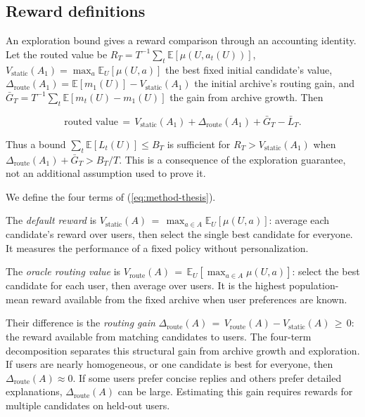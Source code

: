 \documentclass{article} %
\providecommand{\E}{\mathbb{E}}
\renewcommand{\eqref}[1]{\textup{(\ref{#1})}}
\begin{document}
\subsection{Reward definitions}

An exploration bound gives a reward comparison through an accounting
identity. Let the routed value be
$R_T=T^{-1}\sum_t\E[\mu(U,a_t(U))]$,
$V_{\mathrm{static}}(A_1)=\max_a\E_U[\mu(U,a)]$ the best fixed initial
candidate's value, $\Delta_{\mathrm{route}}(A_1)=\E[m_1(U)]-
V_{\mathrm{static}}(A_1)$ the initial archive's routing gain, and
$\bar G_T=T^{-1}\sum_t\E[m_t(U)-m_1(U)]$ the gain from archive growth.
Then

\begin{equation}
\label{eq:method-thesis}
\text{routed value}
\,=\, V_{\mathrm{static}}(A_1) + \Delta_{\mathrm{route}}(A_1) + \bar G_T - \bar L_T.
\end{equation}

Thus a bound $\sum_t\E[L_t(U)]\le B_T$ is sufficient for
$R_T>V_{\mathrm{static}}(A_1)$ when
$\Delta_{\mathrm{route}}(A_1)+\bar G_T>B_T/T$.
This is a consequence of the exploration guarantee, not an additional
assumption used to prove it.

We define the four terms of \eqref{eq:method-thesis}.

The \emph{default reward} is $V_{\mathrm{static}}(A) \,=\, \max_{a \in A} \E_{U}[\mu(U,a)]$: average each candidate's reward over users, then select the single best candidate for everyone. It measures the performance of a fixed policy without personalization.

The \emph{oracle routing value} is $V_{\mathrm{route}}(A) \,=\, \E_{U}[\max_{a \in A} \mu(U,a)]$: select the best candidate for each user, then average over users. It is the highest population-mean reward available from the fixed archive when user preferences are known.

Their difference is the \emph{routing gain} $\Delta_{\mathrm{route}}(A) \,=\, V_{\mathrm{route}}(A) - V_{\mathrm{static}}(A) \,\geq\, 0$: the reward available from matching candidates to users. The four-term decomposition separates this structural gain from archive growth and exploration. If users are nearly homogeneous, or one candidate is best for everyone, then $\Delta_{\mathrm{route}}(A) \approx 0$. If some users prefer concise replies and others prefer detailed explanations, $\Delta_{\mathrm{route}}(A)$ can be large. Estimating this gain requires rewards for multiple candidates on held-out users.
\end{document}
